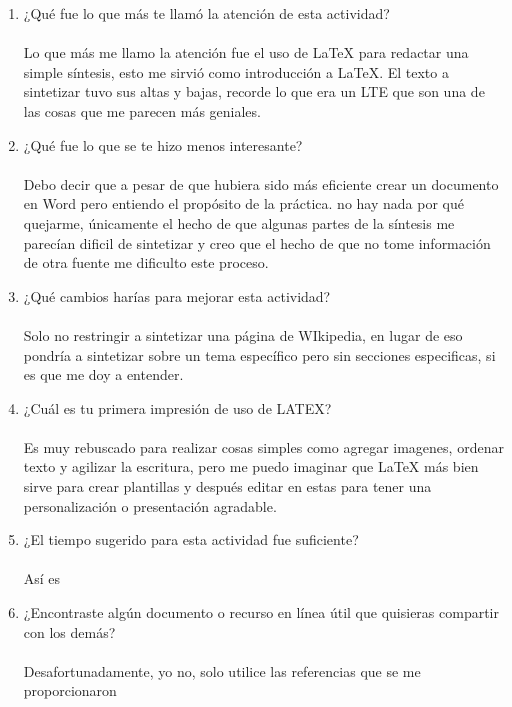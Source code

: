 \documentclass{article} %
\begin{document}
\begin{enumerate}
\item ¿Qué fue lo que más te llamó la atención de esta actividad? ~\\~\\
Lo que más me llamo la atención fue el uso de LaTeX para redactar una simple síntesis, esto me sirvió como introducción a LaTeX. El texto a sintetizar tuvo sus altas y bajas, recorde lo que era un LTE que son una de las cosas que me parecen más geniales.
\item ¿Qué fue lo que se te hizo menos interesante?~\\~\\
Debo decir que a pesar de que hubiera sido más eficiente crear un documento en Word pero entiendo el propósito de la práctica. no hay nada por qué quejarme, únicamente el hecho de que algunas partes de la síntesis me parecían dificil de sintetizar y creo que el hecho de que no tome información de otra fuente me dificulto este proceso.
\item ¿Qué cambios harías para mejorar esta actividad? ~\\~\\
Solo no restringir a sintetizar una página de WIkipedia, en lugar de eso pondría a sintetizar sobre un tema específico pero sin secciones especificas, si es que me doy a entender.
\item ¿Cuál es tu primera impresión de uso de LATEX?~\\~\\
Es muy rebuscado para realizar cosas simples como agregar imagenes, ordenar texto y agilizar la escritura, pero me puedo imaginar que LaTeX más bien sirve para crear plantillas y después editar en estas para tener una personalización o presentación agradable.
\item ¿El tiempo sugerido para esta actividad fue suficiente? ~\\~\\
Así es
\item ¿Encontraste algún documento o recurso en línea útil que quisieras compartir con los demás?  ~\\~\\
Desafortunadamente, yo no, solo utilice las referencias que se me proporcionaron
\end{enumerate}
       
\end{document}
